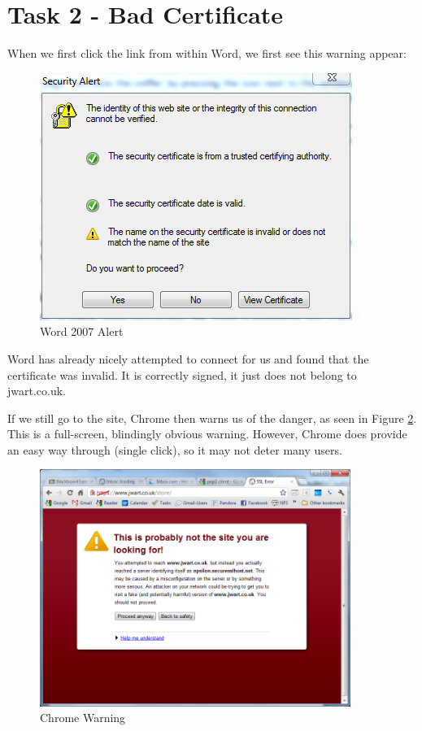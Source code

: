 \documentclass{article}
\begin{document}
\section{Task 2 - Bad Certificate}
\par When we first click the link from within Word, we first see this warning appear:
\begin{figure}[h]
\centering
\includegraphics[]{first_warning}
\caption{Word 2007 Alert}
\label{fig:word_alert}
\end{figure}

\par Word has already nicely attempted to connect for us and found that the certificate was invalid. It is correctly signed, it just does not belong to jwart.co.uk.

\par If we still go to the site, Chrome then warns us of the danger, as seen in Figure \ref{fig:chromewarn}. This is a full-screen, blindingly obvious warning. However, Chrome does provide an easy way through (single click), so it may not deter many users.

\begin{figure}[h]
\centering
\includegraphics[width=0.9\textwidth, trim=0pt 125pt 0pt 30pt, clip]{chrome_warning}
\caption{Chrome Warning}
\label{fig:chromewarn}
\end{figure}
\end{document}
